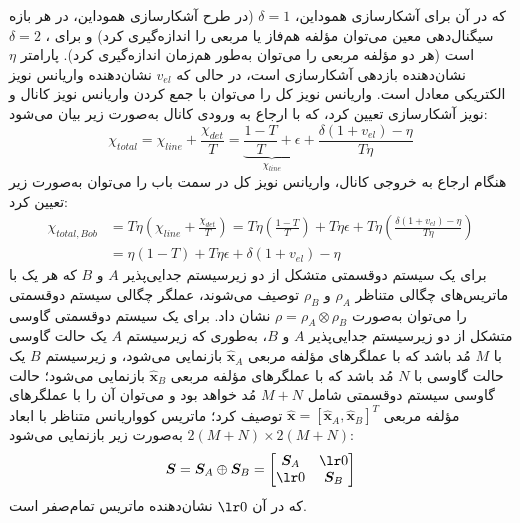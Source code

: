 که در آن برای آشکارسازی هموداین، $\delta = 1$ (در طرح آشکارسازی هموداین، در هر بازه سیگنال‌دهی معین می‌توان مؤلفه هم‌فاز یا مربعی را اندازه‌گیری کرد) و برای ، $\delta = 2$ است (هر دو مؤلفه مربعی را می‌توان به‌طور هم‌زمان اندازه‌گیری کرد). پارامتر $\eta$ نشان‌دهنده بازدهی آشکارسازی است، در حالی که $v_{el}$ نشان‌دهنده واریانس نویز الکتریکی معادل است. واریانس نویز کل را می‌توان با جمع کردن واریانس نویز کانال و نویز آشکارسازی تعیین کرد، که با ارجاع به ورودی کانال به‌صورت زیر بیان می‌شود:
\begin{equation}
	\chi_{total} = \chi_{line} + \frac{\chi_{det}}{T} = \underbrace{\frac{1-T}{T} + \epsilon}_{\chi_{line}} + \frac{\delta(1+v_{el}) - \eta}{T\eta}
	\label{eq:6-90}
\end{equation}
هنگام ارجاع به خروجی کانال، واریانس نویز کل در سمت باب را می‌توان به‌صورت زیر تعیین کرد:
\begin{equation}
	\begin{aligned}
		\chi_{total, Bob} &= T\eta \left( \chi_{line} + \frac{\chi_{det}}{T} \right) = T\eta \left( \frac{1-T}{T} \right) + T\eta\epsilon + T\eta \left( \frac{\delta(1+v_{el}) - \eta}{T\eta} \right) \\
		&= \eta(1-T) + T\eta\epsilon + \delta(1+v_{el}) - \eta
		\label{eq:6-91}
	\end{aligned}
\end{equation}
برای یک سیستم دوقسمتی متشکل از دو زیرسیستم جدایی‌پذیر $A$ و $B$ که هر یک با ماتریس‌های چگالی متناظر $\rho_A$ و $\rho_B$ توصیف می‌شوند، عملگر چگالی سیستم دوقسمتی را می‌توان به‌صورت $\rho = \rho_A \otimes \rho_B$ نشان داد. برای یک سیستم دوقسمتی گاوسی متشکل از دو زیرسیستم جدایی‌پذیر $A$ و $B$، به‌طوری که زیرسیستم $A$ یک حالت گاوسی با $M$ مُد باشد که با عملگرهای مؤلفه مربعی $\hat{\bm{x}}_A$ بازنمایی می‌شود، و زیرسیستم $B$ یک حالت گاوسی با $N$ مُد باشد که با عملگرهای مؤلفه مربعی $\hat{\bm{x}}_B$ بازنمایی می‌شود؛ حالت گاوسی سیستم دوقسمتی شامل $M+N$ مُد خواهد بود و می‌توان آن را با عملگرهای مؤلفه مربعی $\hat{\bm{x}} = [\hat{\bm{x}}_A, \hat{\bm{x}}_B]^T$ توصیف کرد؛ ماتریس کوواریانس متناظر با ابعاد $2(M+N) \times 2(M+N)$ به‌صورت زیر بازنمایی می‌شود:
\begin{equation}
	\bm{S} = \bm{S}_A \oplus \bm{S}_B = \begin{bmatrix} \bm{S}_A & \zeros \\ \zeros & \bm{S}_B \end{bmatrix}
	\label{eq:6-92}
\end{equation}
که در آن $\zeros$ نشان‌دهنده ماتریس تمام‌صفر است.


